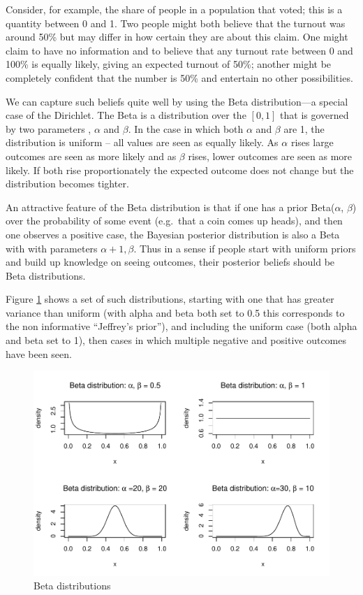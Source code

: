 \documentclass[
  12pt,
]{book}
\begin{document}
Consider, for example, the share of people in a population that voted; this is a quantity between 0 and 1. Two people might both believe that the turnout was around 50\% but may differ in how certain they are about this claim. One might claim to have no information and to believe that any turnout rate between 0 and 100\% is equally likely, giving an expected turnout of 50\%; another might be completely confident that the number is 50\% and entertain no other possibilities.

We can capture such beliefs quite well by using the Beta distribution---a special case of the Dirichlet. The Beta is a distribution over the \([0,1]\) that is governed by two parameters , \(\alpha\) and \(\beta\). In the case in which both \(\alpha\) and \(\beta\) are 1, the distribution is uniform -- all values are seen as equally likely. As \(\alpha\) rises large outcomes are seen as more likely and as \(\beta\) rises, lower outcomes are seen as more likely. If both rise proportionately the expected outcome does not change but the distribution becomes tighter.

An attractive feature of the Beta distribution is that if one has a prior Beta(\(\alpha\), \(\beta\)) over the probability of some event (e.g.~that a coin comes up heads), and then one observes a positive case, the Bayesian posterior distribution is also a Beta with with parameters \(\alpha+1, \beta\). Thus in a sense if people start with uniform priors and build up knowledge on seeing outcomes, their posterior beliefs should be Beta distributions.

Figure \ref{fig:Betas} shows a set of such distributions, starting with one that has greater variance than uniform (with alpha and beta both set to 0.5 this corresponds to the non informative ``Jeffrey's prior''), and including the uniform case (both alpha and beta set to 1), then cases in which multiple negative and positive outcomes have been seen.

\begin{figure}
\centering
\includegraphics{ii_files/figure-latex/Betas-1.pdf}
\caption{\label{fig:Betas}Beta distributions}
\end{figure}
\end{document}
